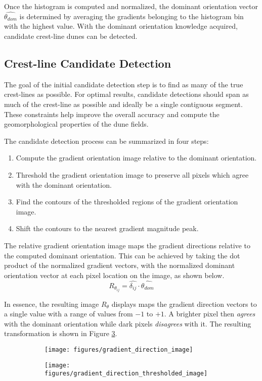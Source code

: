 \documentclass[review]{elsarticle}
\begin{document}
Once the histogram is computed and normalized, the dominant orientation vector $\hat{\theta_{dom}}$ is determined by averaging the gradients belonging to the histogram bin with the highest value. With the dominant orientation knowledge acquired, candidate crest-line dunes can be detected.

\subsection{Crest-line Candidate Detection}  

The goal of the initial candidate detection step is to find as many of the true crest-lines as possible. For optimal results, candidate detections should span as much of the crest-line as possible and ideally be a single contiguous segment. These constraints help improve the overall accuracy and compute the geomorphological properties of the dune fields.

The candidate detection process can be summarized in four steps:

\begin{enumerate}
	\item Compute the gradient orientation image relative to the dominant orientation.
	\item Threshold the gradient orientation image to preserve all pixels which agree with the dominant orientation.
	\item Find the contours of the thresholded regions of the gradient orientation image.
	\item Shift the contours to the nearest gradient magnitude peak.
\end{enumerate}

The relative gradient orientation image maps the gradient directions relative to the computed dominant orientation. This can be achieved by taking the dot product of the normalized gradient vectors, with the normalized dominant orientation vector at each pixel location on the image, as shown below.
\[
R_{\theta_{ij}} = \hat{\delta_{ij}}\cdot \hat{\theta_{dom}}
\]

 In essence, the resulting image $R_{\theta}$ displays maps the gradient direction vectors to a single value with a range of values from $-1$ to $+1$. A brighter pixel then \emph{agrees} with the dominant orientation while dark pixels \emph{disagrees} with it. The resulting transformation is shown in Figure \ref{fig:gradient_direction_image_transformation}.
 
 \begin{figure}
 	\centering
 	\begin{subfigure}{0.48\textwidth}
 		\centering
 		\texttt{[image: figures/gradient\_direction\_image]}
 		\caption{}
 		\label{fig:gradient_direction_image}
 	\end{subfigure}
 	\begin{subfigure}{0.48\textwidth}
 		\centering
 		\texttt{[image: figures/gradient\_direction\_thresholded\_image]}
 		\caption{}
 		\label{fig:gradient_direction_thresholded_image}
 	\end{subfigure}
 	\caption{}
 	\label{fig:gradient_direction_image_transformation}
 \end{figure}
 
\end{document}
